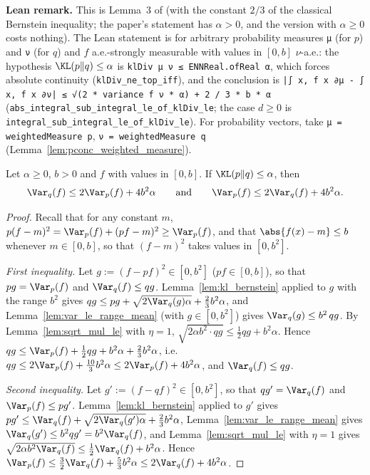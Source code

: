 \textbf{Lean remark.} This is Lemma~3 of \cite{talebi2018variance} (with the constant $2/3$ of
the classical Bernstein inequality; the paper's statement has $\alpha > 0$, and the version with
$\alpha \ge 0$ costs nothing). The Lean statement is for arbitrary probability measures
\texttt{μ} (for $p$) and \texttt{ν} (for $q$) and $f$ a.e.-strongly measurable with values in
$[0, b]$ $\nu$-a.e.: the hypothesis $\KL(p\|q) \le \alpha$ is
\texttt{klDiv μ ν ≤ ENNReal.ofReal α}, which forces absolute continuity
(\texttt{klDiv\_ne\_top\_iff}), and the conclusion is
\texttt{|∫ x, f x ∂μ - ∫ x, f x ∂ν| ≤ √(2 * variance f ν * α) + 2 / 3 * b * α}
(\texttt{abs\_integral\_sub\_integral\_le\_of\_klDiv\_le}; the case $d \ge 0$ is
\texttt{integral\_sub\_integral\_le\_of\_klDiv\_le}). For probability vectors, take
\texttt{μ = weightedMeasure p}, \texttt{ν = weightedMeasure q} (Lemma~\ref{lem:pconc_weighted_measure}).

\begin{lemma}\label{lem:kl_transport_var}
\leanok
Let $\alpha \ge 0$, $b > 0$ and $f$ with values in $[0, b]$. If $\KL(p \| q) \le \alpha$, then
\[
  \Var_q(f) \le 2\Var_p(f) + 4b^2\alpha \qquad \text{and} \qquad \Var_p(f) \le 2\Var_q(f) + 4b^2\alpha .
\]
\end{lemma}

\begin{proof}
\leanok
Recall that for any constant $m$, $p(f - m)^2 = \Var_p(f) + (pf - m)^2 \ge \Var_p(f)$, and that
$\abs{f(x) - m} \le b$ whenever $m \in [0, b]$, so that $(f - m)^2$ takes values in $[0, b^2]$.

\emph{First inequality.} Let $g := (f - pf)^2 \in [0, b^2]$ ($pf \in [0, b]$), so that $pg = \Var_p(f)$
and $\Var_q(f) \le qg$. Lemma~\ref{lem:kl_bernstein} applied to $g$ with the range $b^2$ gives
$qg \le pg + \sqrt{2\Var_q(g)\alpha} + \frac23 b^2\alpha$, and Lemma~\ref{lem:var_le_range_mean}
(with $g \in [0, b^2]$) gives $\Var_q(g) \le b^2\, qg$. By Lemma~\ref{lem:sqrt_mul_le} with $\eta = 1$,
$\sqrt{2\alpha b^2 \cdot qg} \le \frac12 qg + b^2\alpha$. Hence
$qg \le \Var_p(f) + \frac12 qg + b^2\alpha + \frac23 b^2\alpha$, i.e.\
$qg \le 2\Var_p(f) + \frac{10}{3} b^2\alpha \le 2\Var_p(f) + 4b^2\alpha$, and $\Var_q(f) \le qg$.

\emph{Second inequality.} Let $g' := (f - qf)^2 \in [0, b^2]$, so that $qg' = \Var_q(f)$ and
$\Var_p(f) \le pg'$. Lemma~\ref{lem:kl_bernstein} applied to $g'$ gives
$pg' \le \Var_q(f) + \sqrt{2\Var_q(g')\alpha} + \frac23 b^2\alpha$, Lemma~\ref{lem:var_le_range_mean}
gives $\Var_q(g') \le b^2 qg' = b^2\Var_q(f)$, and Lemma~\ref{lem:sqrt_mul_le} with $\eta = 1$ gives
$\sqrt{2\alpha b^2 \Var_q(f)} \le \frac12\Var_q(f) + b^2\alpha$. Hence
$\Var_p(f) \le \frac32\Var_q(f) + \frac53 b^2\alpha \le 2\Var_q(f) + 4b^2\alpha$.
\end{proof}

